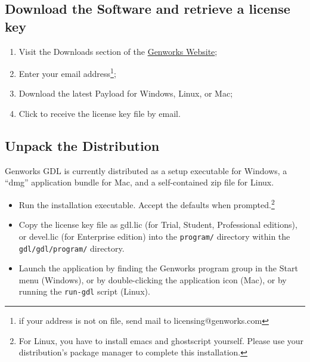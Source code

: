 \documentclass [11pt]{book}
\begin{document}
\subsection{Download the Software and retrieve a license key}

\label{subsec:downloadthesoftwareandretrievealicensekey}



\begin{enumerate}

\item Visit the Downloads section of the \href{http://genworks.com}{Genworks Website};

\item Enter your email address\footnote{if your address is not on file, send mail to licensing@genworks.com};

\item Download the latest Payload for Windows, Linux, or Mac;

\item Click to receive the license key file by email.

\end{enumerate}



\subsection{Unpack the Distribution}

\label{subsec:unpackthedistribution}

Genworks GDL is currently distributed as a setup executable for Windows,
a ``dmg'' application bundle for Mac, and a self-contained zip file for Linux.

\begin{itemize}

\item Run the installation executable. Accept the defaults when prompted.\footnote{For Linux, you have to install emacs and ghostscript yourself. Please use your distribution's package manager to complete this installation.}

\item Copy the license key file as gdl.lic (for Trial,
	 Student, Professional editions), or devel.lic (for Enterprise edition) into the \texttt{program/} directory within the \texttt{gdl/gdl/program/} directory.

\item Launch the application by finding the Genworks program group in the Start menu (Windows), or by double-clicking the application icon (Mac), or by running the \texttt{run-gdl} script (Linux).

\end{itemize}
\end{document}
